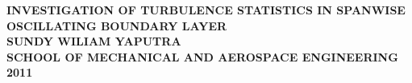\begin{titlepage}
  \begin{center}
    \begin{figure}
    \end{figure}
    \vspace*{1cm}
    \noindent \textbf{\LARGE INVESTIGATION OF TURBULENCE STATISTICS IN SPANWISE OSCILLATING BOUNDARY LAYER} \\
    \vspace*{7cm}
    \noindent \textbf{\large SUNDY WILIAM YAPUTRA} \\
    \vspace*{3cm}
    \noindent \textbf{\large SCHOOL OF MECHANICAL AND AEROSPACE ENGINEERING} \\
    \vspace*{0.5cm} \textbf{2011}
  \end{center}
\end{titlepage}

